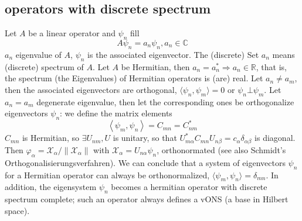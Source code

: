\subsection{operators with discrete spectrum}
Let $A$ be a linear operator and $\psi_n$ fill
\begin{equation}
    A\psi_n=a_n\psi_n, a_n\in \mathbb{C}
\end{equation}
$a_n$ eigenvalue of $A$, $\psi_n$ is the associated eigenvector. The (discrete)
Set ${a_n}$ means (discrete) spectrum of $A$.
Let $A$ be Hermitian, then $a_n=a_n^*\Rightarrow a_n\in\mathbb{R}$, that is, the spectrum (the
Eigenvalues) of Hermitian operators is (are) real.
Let $a_n\neq a_m$, then the associated eigenvectors are orthogonal, $\langle \psi_n, \psi_m\rangle=0$ or $\psi_n \bot\psi_m$.
Let $a_n=a_m$ degenerate eigenvalue, then let the corresponding ones be orthogonalize eigenvectors {$\psi_n$}: we define the matrix elements
\begin{equation}
    \left\langle\psi_{m}, \psi_{n}\right\rangle= C_{m n}=C_{n m}^{*}
    \end{equation}
$C_{mn}$ is Hermitian, so $\exists U_{nm},U$ is unitary, so that $U_{m\alpha}^*C_{mn}U_{n\beta}=c_{\alpha}\delta_{\alpha\beta}$ is diagonal. Then $\varphi_{\alpha}=\mathcal{X}_{\alpha}/\parallel\mathcal{X}_{\alpha}\parallel$ with $\mathcal{X}_{\alpha}=U_{n\alpha}\psi_n$, orthonormated (see also Schmidt's Orthogonalisierungsverfahren).
We can conclude that a system of eigenvectors {$\psi_n$} for a Hermitian operator can always be orthonormalized, $\langle\psi_m,\psi_n\rangle=\delta_{mn}$. In addition, the eigensystem {$\psi_n$} becomes a hermitian operator with discrete spectrum complete; such an operator always defines a vONS (a base in Hilbert space).
